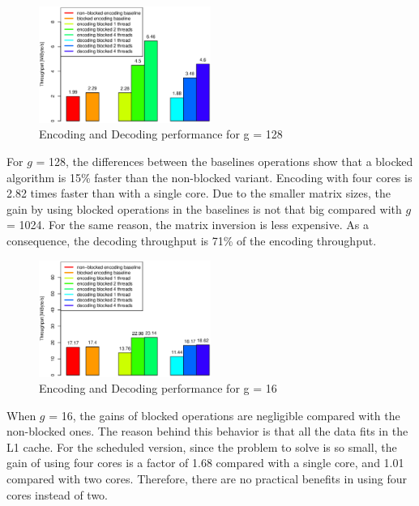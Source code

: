 \begin{figure}[h!]
\centering
\includegraphics[width=0.5\textwidth]{images/2015-04-18_encoding_decoding_128.eps}
\caption{Encoding and Decoding performance for g = 128 \cite{wunderlich2015network}}
\label{enc_dec128}
\end{figure}

For $g$ = 128, the differences between the baselines operations show that a
blocked algorithm is 15\% faster than the non-blocked variant. Encoding with
four cores is 2.82 times faster than with a single core. Due to the smaller
matrix sizes, the gain by using blocked operations in the baselines is not that
big compared with $g$ = 1024. For the same reason, the matrix inversion is less
expensive. As a consequence, the decoding throughput is 71\% of the encoding
throughput.

\begin{figure}[h!]
\centering
\includegraphics[width=0.5\textwidth]{images/2015-04-18_encoding_decoding_16.eps}
\caption{Encoding and Decoding performance for g = 16 \cite{wunderlich2015network}}
\label{enc_dec16}
\end{figure}

When $g$ = 16, the gains of blocked operations are negligible compared with the
non-blocked ones. The reason behind this behavior is that all the data fits in
the L1 cache. For the scheduled version, since the problem to solve is so small,
the gain of using four cores is a factor of 1.68 compared with a single core,
and 1.01 compared with two cores. Therefore, there are no practical benefits in
using four cores instead of two.

